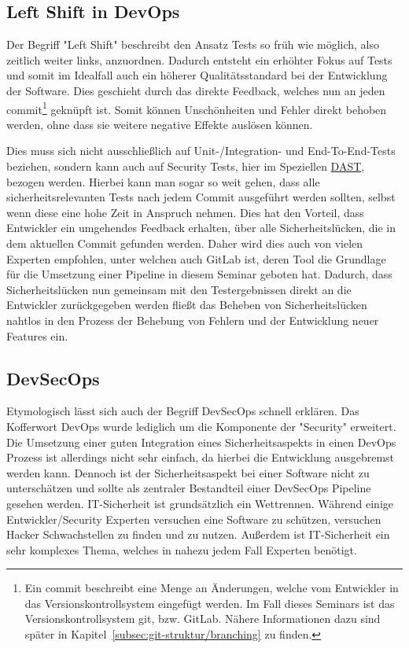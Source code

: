 \subsection{Left Shift in DevOps}

Der Begriff "Left Shift" beschreibt den Ansatz Tests so früh wie möglich, also zeitlich weiter links, anzuordnen.
Dadurch entsteht ein erhöhter Fokus auf Tests und somit im Idealfall auch ein höherer Qualitätsstandard bei der Entwicklung der Software.\cite{dr.darrellr.schragDevOpsShiftLeft2016}
Dies geschieht durch das direkte Feedback, welches nun an jeden commit\footnote{Ein commit beschreibt eine Menge an Änderungen, welche vom Entwickler in das Versionskontrollsystem eingefügt werden. Im Fall dieses Seminars ist das Versionskontrollsystem git, bzw. GitLab. Nähere Informationen dazu sind später in Kapitel~\ref{subsec:git-struktur/branching} zu finden.} geknüpft ist.
Somit können Unschönheiten und Fehler direkt behoben werden, ohne dass sie weitere negative Effekte auslösen können.

Dies muss sich nicht ausschließlich auf Unit-/Integration- und End-To-End-Tests beziehen, sondern kann auch auf Security Tests, hier im Speziellen \hyperref[subsubsec:dast]{DAST}, bezogen werden.
Hierbei kann man sogar so weit gehen, dass alle sicherheitsrelevanten Tests nach jedem Commit ausgeführt werden sollten, selbst wenn diese eine hohe Zeit in Anspruch nehmen.
Dies hat den Vorteil, dass Entwickler ein umgehendes Feedback erhalten, über alle Sicherheitslücken, die in dem aktuellen Commit gefunden werden.
Daher wird dies auch von vielen Experten empfohlen, unter welchen auch GitLab ist, deren Tool die Grundlage für die Umsetzung einer Pipeline in diesem Seminar geboten hat.\cite{gitlabSeismicShiftApplication2020}
Dadurch, dass Sicherheitslücken nun gemeinsam mit den Testergebnissen direkt an die Entwickler zurückgegeben werden fließt das Beheben von Sicherheitslücken nahtlos in den Prozess der Behebung von Fehlern und der Entwicklung neuer Features ein.


\subsection{DevSecOps}

Etymologisch lässt sich auch der Begriff DevSecOps schnell erklären.
Das Kofferwort DevOps wurde lediglich um die Komponente der "Security" erweitert.
Die Umsetzung einer guten Integration eines Sicherheitsaspekts in einen DevOps Prozess ist allerdings nicht sehr einfach, da hierbei die Entwicklung ausgebremst werden kann.
Dennoch ist der Sicherheitsaspekt bei einer Software nicht zu unterschätzen und sollte als zentraler Bestandteil einer DevSecOps Pipeline gesehen werden.
IT-Sicherheit ist grundsätzlich ein Wettrennen.
Während einige Entwickler/Security Experten versuchen eine Software zu schützen, versuchen Hacker Schwachstellen zu finden und zu nutzen.
Außerdem ist IT-Sicherheit ein sehr komplexes Thema, welches in nahezu jedem Fall Experten benötigt.

